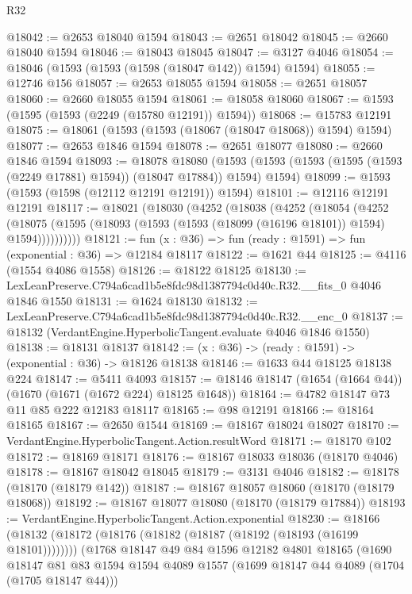 \begin{lexlean}{R32}
\begin{coremodule}
@18042 := @2653 @18040 @1594
@18043 := @2651 @18042
@18045 := @2660 @18040 @1594
@18046 := @18043 @18045
@18047 := @3127 @4046
@18054 := @18046 (@1593 (@1593 (@1598 (@18047 @142)) @1594) @1594)
@18055 := @12746 @156
@18057 := @2653 @18055 @1594
@18058 := @2651 @18057
@18060 := @2660 @18055 @1594
@18061 := @18058 @18060
@18067 := @1593 (@1595 (@1593 (@2249 (@15780 @12191)) @1594))
@18068 := @15783 @12191
@18075 := @18061 (@1593 (@1593 (@18067 (@18047 @18068)) @1594) @1594)
@18077 := @2653 @1846 @1594
@18078 := @2651 @18077
@18080 := @2660 @1846 @1594
@18093 := @18078
    @18080
    (@1593 (@1593 (@1593 (@1595 (@1593 (@2249 @17881) @1594)) (@18047 @17884)) @1594) @1594)
@18099 := @1593 (@1593 (@1598 (@12112 @12191 @12191)) @1594)
@18101 := @12116 @12191 @12191
@18117 := @18021
    (@18030
      (@4252
        (@18038
          (@4252
            (@18054
              (@4252
                (@18075 (@1595 (@18093 (@1593 (@1593 (@18099 (@16196 @18101)) @1594) @1594))))))))))
@18121 := fun (x : @36) => fun (ready : @1591) => fun (exponential : @36) => @12184 @18117
@18122 := @1621 @44
@18125 := @4116 (@1554 @4086 @1558)
@18126 := @18122 @18125
@18130 := LexLeanPreserve.C794a6cad1b5e8fdc98d1387794c0d40c.R32.__fits_0 @4046 @1846 @1550
@18131 := @1624 @18130
@18132 := LexLeanPreserve.C794a6cad1b5e8fdc98d1387794c0d40c.R32.__enc_0
@18137 := @18132 (VerdantEngine.HyperbolicTangent.evaluate @4046 @1846 @1550)
@18138 := @18131 @18137
@18142 := (x : @36) -> (ready : @1591) -> (exponential : @36) -> @18126 @18138
@18146 := @1633 @44 @18125 @18138 @224
@18147 := @5411 @4093
@18157 := @18146 @18147 (@1654 (@1664 @44)) (@1670 (@1671 (@1672 @224) @18125 @1648))
@18164 := @4782 @18147 @73 @11 @85 @222 @12183 @18117
@18165 := @98 @12191
@18166 := @18164 @18165
@18167 := @2650 @1544
@18169 := @18167 @18024 @18027
@18170 := VerdantEngine.HyperbolicTangent.Action.resultWord
@18171 := @18170 @102
@18172 := @18169 @18171
@18176 := @18167 @18033 @18036 (@18170 @4046)
@18178 := @18167 @18042 @18045
@18179 := @3131 @4046
@18182 := @18178 (@18170 (@18179 @142))
@18187 := @18167 @18057 @18060 (@18170 (@18179 @18068))
@18192 := @18167 @18077 @18080 (@18170 (@18179 @17884))
@18193 := VerdantEngine.HyperbolicTangent.Action.exponential
@18230 := @18166
    (@18132 (@18172 (@18176 (@18182 (@18187 (@18192 (@18193 (@16199 @18101))))))))
    (@1768
      @18147
      @49
      @84
      @1596
      @12182
      @4801
      @18165
      (@1690
        @18147
        @81
        @83
        @1594
        @1594
        @4089
        @1557
        (@1699 @18147 @44 @4089 (@1704 (@1705 @18147 @44)))

\end{coremodule}
\end{lexlean}
